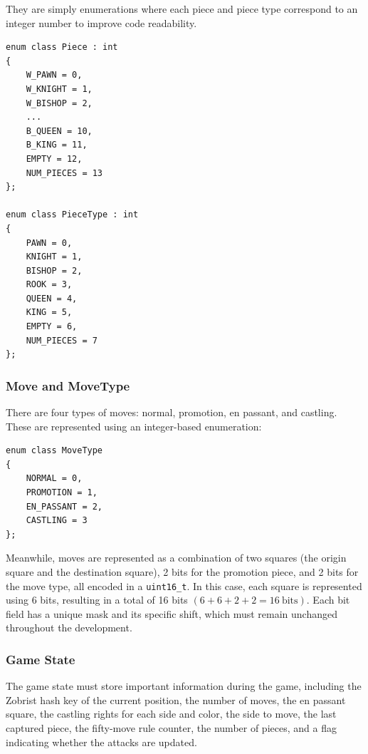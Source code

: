 They are simply enumerations where each piece and piece type correspond to an integer number to improve code readability.

\begin{lstlisting}[breaklines=true, frame=single, caption={Piece and PieceType enumerators.}]
enum class Piece : int
{
    W_PAWN = 0,
    W_KNIGHT = 1,
    W_BISHOP = 2,
    ...
    B_QUEEN = 10,
    B_KING = 11,
    EMPTY = 12,
    NUM_PIECES = 13
};

enum class PieceType : int
{
    PAWN = 0,
    KNIGHT = 1,
    BISHOP = 2,
    ROOK = 3,
    QUEEN = 4,
    KING = 5,
    EMPTY = 6,
    NUM_PIECES = 7
};
\end{lstlisting}

\subsubsection{Move and MoveType}

There are four types of moves: normal, promotion, en passant, and castling. These are represented using an integer-based enumeration:

\begin{lstlisting}[breaklines=true, frame=single, caption={MoveType enumerator.}]
enum class MoveType
{
    NORMAL = 0,
    PROMOTION = 1,
    EN_PASSANT = 2,
    CASTLING = 3
};
\end{lstlisting}

\noindent Meanwhile, moves are represented as a combination of two squares (the origin square and the destination square), 2 bits for the promotion piece, and 2 bits for the move type, all encoded in a \texttt{uint16\_t}. In this case, each square is represented using 6 bits, resulting in a total of 16 bits $(6 + 6 + 2 + 2 = 16~\mathrm{bits})$. Each bit field has a unique mask and its specific shift, which must remain unchanged throughout the development.

\subsubsection{Game State}

The game state must store important information during the game, including the Zobrist hash key of the current position, the number of moves, the en passant square, the castling rights for each side and color, the side to move, the last captured piece, the fifty-move rule counter, the number of pieces, and a flag indicating whether the attacks are updated.

